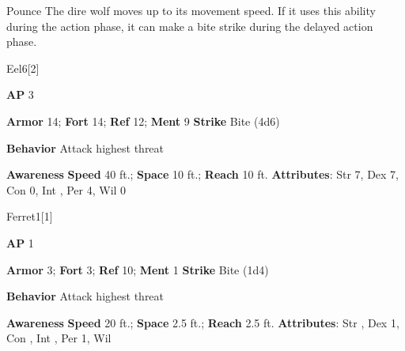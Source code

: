 \begin{freeability}{Pounce}
The dire wolf moves up to its movement speed.
If it uses this ability during the action phase, it can make a bite strike during the delayed action phase.
\end{freeability}

\begin{monsection}{Eel}{6}[2]
\vspace{-1em}\vspace{-1em}
\begin{spellcontent}
\begin{spelltargetinginfo}
{\textbf{AP} 3}

\pari \textbf{Armor} 14;
\textbf{Fort} 14;
\textbf{Ref} 12;
\textbf{Ment} 9
\pari \textbf{Strike} Bite  (4d6)



\pari \textbf{Behavior} Attack highest threat
\end{spelltargetinginfo}
\end{spellcontent}

\begin{monsterfooter}
\pari \textbf{Awareness} 
\pari \textbf{Speed} 40 ft.;
\textbf{Space} 10 ft.;
\textbf{Reach} 10 ft.
\pari \textbf{Attributes}:
Str 7,
Dex 7,
Con 0,
Int ,
Per 4,
Wil 0
\end{monsterfooter}
\end{monsection}

\begin{monsection}{Ferret}{1}[1]
\vspace{-1em}\vspace{-1em}
\begin{spellcontent}
\begin{spelltargetinginfo}
{\textbf{AP} 1}

\pari \textbf{Armor} 3;
\textbf{Fort} 3;
\textbf{Ref} 10;
\textbf{Ment} 1
\pari \textbf{Strike} Bite  (1d4)



\pari \textbf{Behavior} Attack highest threat
\end{spelltargetinginfo}
\end{spellcontent}

\begin{monsterfooter}
\pari \textbf{Awareness} 
\pari \textbf{Speed} 20 ft.;
\textbf{Space} 2.5 ft.;
\textbf{Reach} 2.5 ft.
\pari \textbf{Attributes}:
Str ,
Dex 1,
Con ,
Int ,
Per 1,
Wil 
\end{monsterfooter}
\end{monsection}

